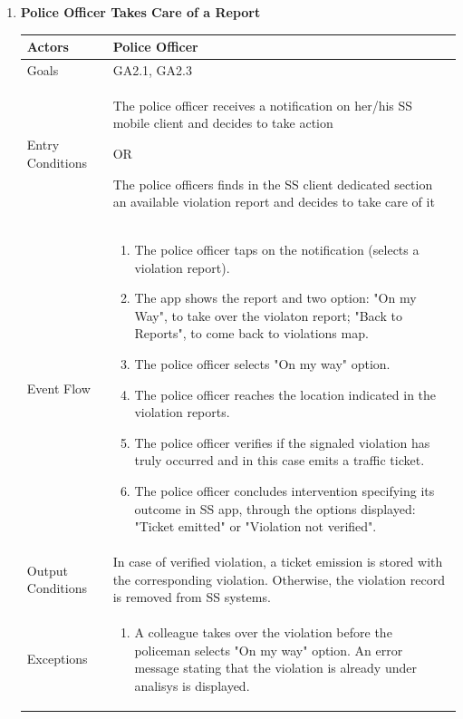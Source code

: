 \begin{enumerate}
	\item \textbf{Police Officer Takes Care of a Report}
		\begin{table}[h!]
		\begin{tabular}{|l|p{}|}
		\hline
		Actors            			&       	Police Officer\\ \hline
		Goals             			&         	GA2.1, GA2.3\\ \hline
		Entry Conditions  	&  		The police officer receives a notification on her/his SS mobile client and decides to take action\newline
													\centerline{OR}\newline
													The police officers finds in the SS client dedicated section an available violation report and decides to take care of it \\ \hline
		Event Flow        		&          
				\begin{enumerate}[label=\alph*)]
					\item The police officer taps on the notification (selects a violation report).
					\item The app shows the report and two option: "On my Way", to take over the violaton report; "Back to Reports", to come back to violations map.
					\item The police officer selects "On my way" option.
					\item The police officer reaches the location indicated in the violation reports.
					\item The police officer verifies if the signaled violation has truly occurred and in this case emits a traffic ticket.
					\item The police officer concludes intervention specifying its outcome in SS app, through the options displayed: "Ticket emitted" or "Violation not verified". 
					\end{enumerate}\\ \hline
		Output Conditions &    		In case of verified violation, a ticket emission is stored with the corresponding violation. Otherwise, the violation record is removed from SS systems.\\ \hline
		Exceptions        		&       	
				\begin{enumerate}[label=\alph*)]
					\item A colleague takes over the violation before the policeman selects "On my way" option. An error message stating that the violation is already under analisys is displayed.
				\end{enumerate}\\ \hline
	\end{tabular}
	\end{table}
	
	
	\end{enumerate}
	
